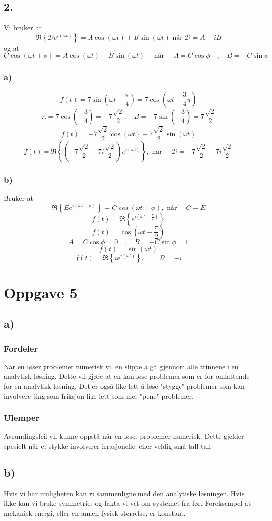 \documentclass{article}
\begin{document}
\subsection*{2.}
Vi bruker at 
\[
\mathfrak{R} \left\{ 𝒟  e^{i \left(ωt \right) } \right\}  = A \cos (ωt) + B \sin (ωt) \text{ når } 𝒟  = A - iB 
\]
og at 
\[
C \cos (ωt + ϕ) = A \cos (ωt) + B \sin (ωt) \quad \text{ når } \quad A = C \cos ϕ \quad , \quad B = -C \sin ϕ
\]
\subsubsection*{a)}
\[
f(t) = 7 \sin \left( ωt - \frac{π}{4} \right) = 7 \cos \left( ωt - \frac{3}{4}π \right) 
\]
\[
A = 7 \cos \left( -\frac{3}{4} \right) = - 7\frac{\sqrt{2}}{2} , \quad B = -7 \sin \left( - \frac{3}{4} \right) = 7\frac{\sqrt{2}}{2}
\]
\[
f(t) = - 7\frac{\sqrt{2}}{2} \cos (ωt) + 7\frac{\sqrt{2}}{2} \sin (ωt)
\]
\[
f(t) = \mathfrak{R} \left\{ \left( - 7\frac{\sqrt{2}}{2} - 7i \frac{\sqrt{2}}{2} \right) e^{i(ωt)} \right\}, \text{ når } \quad 𝒟  = - 7\frac{\sqrt{2}}{2} - 7i \frac{\sqrt{2}}{2} 
\]
\subsubsection*{b)}
Bruker at 
\[
\mathfrak{R} \left\{ E e^{i(ωt + ϕ)} \right\} = C \cos (ωt + ϕ), \text{ når } \quad C = E
\]
\[
f(t) = \mathfrak{R}  \left\{ e^{i\left( ωt - \frac{π}{2} \right) } \right\} 
\]
\[
f(t) = \cos \left( ωt - \frac{π}{2} \right)
\]
\[
A = C\cos ϕ = 0 \quad , \quad B = - C\sin ϕ = 1
\]
\[
f(t) = \sin (ωt)
\]
\[
f(t) = \mathfrak{R} \left\{ i e^{i(ωt)} \right\}, \qquad 𝒟  = -i
\]

\section*{Oppgave 5}
\subsection*{a)}
\subsubsection*{Fordeler}
Når en løser problemer numerisk vil en slippe å gå gjennom alle trinnene i en analytisk løsning. Dette vil gjøre at en kan løse problemer som er for omfattende for en analytisk løsning. Det er også like lett å løse "stygge" problemer som kan involvere ting som friksjon like lett som mer "pene" problemer. 

\subsubsection*{Ulemper}
Avrundingsfeil vil kunne oppstå når en løser problemer numerisk. Dette gjelder spesielt når et stykke involverer irrasjonelle, eller veldig små tall tall

\subsection*{b)}
Hvis vi har muligheten kan vi sammenligne med den analytiske løsningen. Hvis ikke kan vi bruke symmetrier og fakta vi vet om systemet fra før. Foreksempel at mekanisk energi, eller en annen fysisk størrelse, er konstant.
\end{document}
